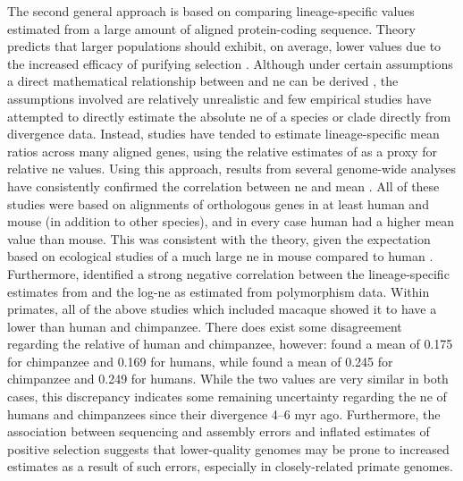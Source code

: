 The second general approach is based on comparing lineage-specific
\dnds values estimated from a large amount of aligned protein-coding
sequence. Theory predicts that larger populations should exhibit, on
average, lower \dnds values due to the increased efficacy of purifying
selection \citep{Ellegren2008}. Although under certain assumptions a
direct mathematical relationship between \dnds and \ac{ne} can be
derived \citep{Nielsen2003,Kryazhimskiy2008}, the assumptions involved
are relatively unrealistic and few empirical studies have attempted to
directly estimate the absolute \ac{ne} of a species or clade directly
from divergence data. Instead, studies have tended to estimate
lineage-specific mean \dnds ratios across many aligned genes, using
the relative estimates of \dnds as a proxy for relative \ac{ne}
values. Using this approach, results from several genome-wide analyses
have consistently confirmed the correlation between \ac{ne} and mean
\dnds
\citep{LindbladToh2005Genome,Macaque2007,Sequencing2005a,Warren2008b,Kosiol2008}. All
of these studies were based on alignments of orthologous genes in at
least human and mouse (in addition to other species), and in every
case human had a higher mean \dnds value than mouse. This was
consistent with the theory, given the expectation based on ecological
studies of a much large \ac{ne} in mouse compared to human
\citep{Ellegren2008}. Furthermore, \citet{Ellegren2008} identified a
strong negative correlation between the lineage-specific \dnds
estimates from \citet{Kosiol2008} and the log-\ac{ne} as estimated
from polymorphism data. Within primates, all of the above studies
which included macaque showed it to have a lower \dnds than human and
chimpanzee. There does exist some disagreement regarding the relative
\dnds of human and chimpanzee, however: \citet{Macaque2007} found a
mean \dnds of 0.175 for chimpanzee and 0.169 for humans, while
\citet{Kosiol2008} found a mean \dnds of 0.245 for chimpanzee and
0.249 for humans. While the two values are very similar in both cases,
this discrepancy indicates some remaining uncertainty regarding the
\ac{ne} of humans and chimpanzees since their divergence 4--6 \ac{myr}
ago. Furthermore, the association between sequencing and assembly
errors and inflated estimates of positive selection
\citep{Schneider2009} suggests that lower-quality genomes may be prone
to increased \dnds estimates as a result of such errors, especially in
closely-related primate genomes.

